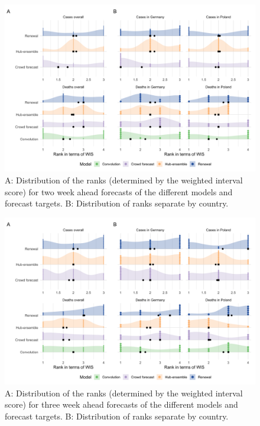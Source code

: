 \documentclass[10pt,letterpaper]{article}
\begin{document}
\begin{figure}[H]
\includegraphics[width=1\linewidth,]{../analysis/plots/distribution_scores_wis-2-ranks} \caption{A: Distribution of the ranks (determined by the weighted interval score) for two week ahead forecasts of the different models and forecast targets. B: Distribution of ranks separate by country.}\label{fig:distribution-scores-ranks-2}
\end{figure}

\begin{figure}[H]
\includegraphics[width=1\linewidth,]{../analysis/plots/distribution_scores_wis-3-ranks} \caption{A: Distribution of the ranks (determined by the weighted interval score) for three week ahead forecasts of the different models and forecast targets. B: Distribution of ranks separate by country.}\label{fig:distribution-scores-ranks-3}
\end{figure}
\end{document}
